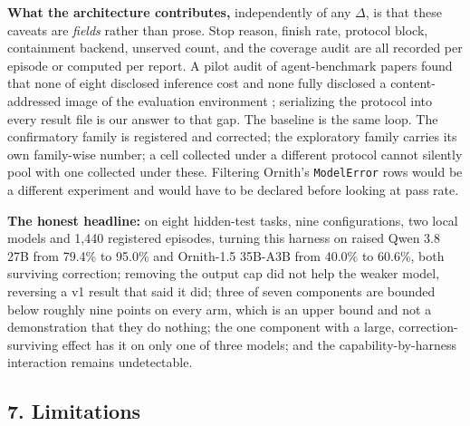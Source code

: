 \documentclass[
  10pt,
  a4paper,
]{article}
\newcounter{none} %
\let\oldtexttt\texttt
\renewcommand{\texttt}[1]{{\small\oldtexttt{#1}}}
\begin{document}
\textbf{What the architecture contributes,} independently of any
\(\Delta\), is that these caveats are \emph{fields} rather than prose.
Stop reason, finish rate, protocol block, containment backend, unserved
count, and the coverage audit are all recorded per episode or computed
per report. A pilot audit of agent-benchmark papers found that none of
eight disclosed inference cost and none fully disclosed a
content-addressed image of the evaluation environment
\citep{moghadasi2026disclose}; serializing the protocol into every
result file is our answer to that gap. The baseline is the same loop.
The confirmatory family is registered and corrected; the exploratory
family carries its own family-wise number; a cell collected under a
different protocol cannot silently pool with one collected under these.
Filtering Ornith's \texttt{ModelError} rows would be a different
experiment and would have to be declared before looking at pass rate.

\textbf{The honest headline:} on eight hidden-test tasks, nine
configurations, two local models and 1,440 registered episodes, turning
this harness on raised Qwen 3.8 27B from 79.4\% to 95.0\% and Ornith-1.5
35B-A3B from 40.0\% to 60.6\%, both surviving correction; removing the
output cap did not help the weaker model, reversing a v1 result that
said it did; three of seven components are bounded below roughly nine
points on every arm, which is an upper bound and not a demonstration
that they do nothing; the one component with a large,
correction-surviving effect has it on only one of three models; and the
capability-by-harness interaction remains undetectable.

\subsection{7. Limitations}\label{limitations}
\end{document}
